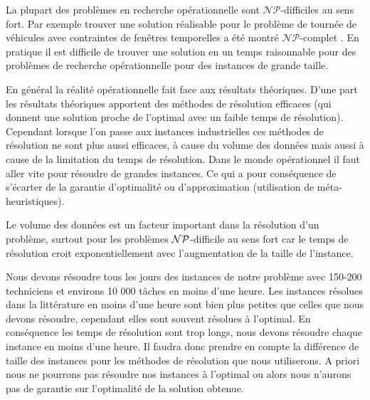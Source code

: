 La plupart des problèmes en recherche opérationnelle sont $\mathcal{NP}$-difficiles au sens fort. Par exemple trouver une solution réalisable pour le problème de tournée de véhicules avec contraintes de fenêtres temporelles a été montré $\mathcal{NP}$-complet \cite{Desrosiers1995}.
En pratique il est difficile de trouver une solution en un temps raisonnable pour des problèmes de recherche opérationnelle pour des instances de grande taille.

En général la réalité opérationnelle fait face aux résultats théoriques. D'une part les résultats théoriques apportent des méthodes de résolution efficaces (qui donnent une solution proche de l'optimal avec un faible temps de résolution).
Cependant lorsque l'on passe aux instances industrielles ces méthodes de résolution ne sont plus aussi efficaces, à cause du volume des données mais aussi à cause de la limitation du temps de résolution.
Dans le monde opérationnel il faut aller vite pour résoudre de grandes instances. Ce qui a pour conséquence de s'écarter de la garantie d'optimalité ou d'approximation (utilisation de méta-heuristiques).


Le volume des données est un facteur important dans la résolution d'un problème, surtout pour les problèmes $\mathcal{NP}$-difficile au sens fort car le temps de résolution croit exponentiellement avec l'augmentation de la taille de l'instance.

Nous devons résoudre tous les jours des instances de notre problème avec 150-200 techniciens et environs 10 000 tâches en moins d'une heure. 
Les instances résolues dans la littérature en moins d'une heure sont bien plus petites que celles que nous devons résoudre, cependant elles sont souvent résolues à l'optimal.
En conséquence les temps de résolution sont trop longs, nous devons résoudre chaque instance en moins d'une heure. 
Il faudra donc prendre en compte la différence de taille des instances pour les méthodes de résolution que nous utiliserons. 
A priori nous ne pourrons pas résoudre nos instances à l'optimal ou alors nous n'aurons pas de garantie sur l'optimalité de la solution obtenue.
